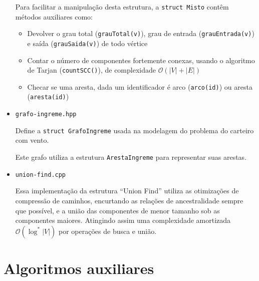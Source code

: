\begin{itemize}
        Para facilitar a manipulação desta estrutura, a \texttt{struct Misto} contêm métodos auxiliares como:
        \begin{itemize}
            \item  Devolver o grau total (\texttt{grauTotal(v)}), grau de entrada (\texttt{grauEntrada(v)}) e saída (\texttt{grauSaida(v)}) de todo vértice
            \item Contar o número de componentes fortemente conexas, usando o algoritmo de Tarjan (\texttt{countSCC()}), de complexidade $\mathcal{O}(|V| + |E|)$
            \item Checar se uma aresta, dada um identificador é arco (\texttt{arco(id)}) ou aresta (\texttt{aresta(id)})
        \end{itemize}

    \item \texttt{grafo-ingreme.hpp}

    Define a \texttt{struct GrafoIngreme} usada na modelagem do problema do carteiro com vento.

    Este grafo utiliza a estrutura \texttt{ArestaIngreme} para representar suas arestas.

    \item \texttt{union-find.cpp}

        Essa implementação da estrutura ``Union Find'' utiliza as otimizações de compressão de caminhos, encurtando as relações de ancestralidade sempre que possível, e a união das componentes de menor tamanho sob as componentes maiores.
        Atingindo assim uma complexidade amortizada $\mathcal{O}(\log^*|V|)$ por operações de busca e união.
\end{itemize}

\section{Algoritmos auxiliares}

